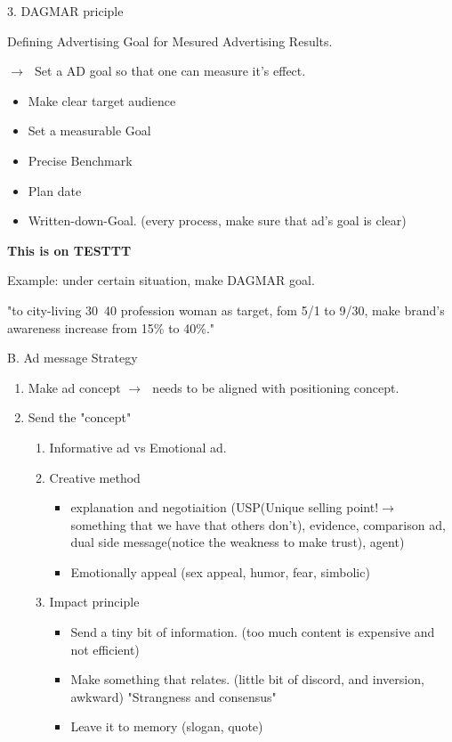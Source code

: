 \documentclass[12pt]{article}
\newcommand{\ra}{$\rightarrow \text{ }$}
\begin{document}
\begin{itemize}
3. DAGMAR priciple


Defining Advertising Goal for Mesured Advertising Results.

\ra Set a AD goal so that one can measure it's effect.

\begin{itemize}
	\item Make clear target audience
	\item Set a measurable Goal
	\item Precise Benchmark
	\item Plan date
	\item Written-down-Goal. (every process, make sure that ad's goal is clear)
\end{itemize}

\textbf{This is on TESTTT}

Example: under certain situation, make DAGMAR goal.

\begin{tcolorbox}
	"to city-living 30~40 profession woman as target, fom 5/1 to 9/30, make brand's awareness increase from 15\% to 40\%."

\end{tcolorbox}

B. Ad message Strategy

\begin{enumerate}
	\item Make ad concept \ra needs to be aligned with positioning concept.
	\item Send the "concept"
	\begin{enumerate}
		\item Informative ad vs Emotional ad.
		\item Creative method
		\begin{itemize}
			\item explanation and negotiaition (USP(Unique selling point!\ra something that we have that others don't), evidence, comparison ad, dual side message(notice the weakness to make trust), agent)
			\item Emotionally appeal (sex appeal, humor, fear, simbolic)
		\end{itemize}
		\item Impact principle
		\begin{itemize}
			\item Send a tiny bit of information. (too much content is expensive and not efficient)
			\item Make something that relates. (little bit of discord, and inversion, awkward) "Strangness and consensus"
			\item Leave it to memory (slogan, quote)
		\end{itemize}


\end{enumerate}
\end{enumerate}
\end{itemize}
\end{document}
